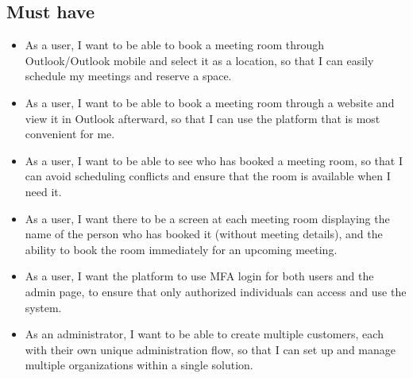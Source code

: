 \subsection{Must have}
\begin{itemize}
\item As a user, I want to be able to book a meeting room through Outlook/Outlook mobile and select it as a location, so that I can easily schedule my meetings and reserve a space.
\item As a user, I want to be able to book a meeting room through a website and view it in Outlook afterward, so that I can use the platform that is most convenient for me.
\item As a user, I want to be able to see who has booked a meeting room, so that I can avoid scheduling conflicts and ensure that the room is available when I need it.
\item As a user, I want there to be a screen at each meeting room displaying the name of the person who has booked it (without meeting details), and the ability to book the room immediately for an upcoming meeting.
\item As a user, I want the platform to use MFA login for both users and the admin page, to ensure that only authorized individuals can access and use the system.
\item As an administrator, I want to be able to create multiple customers, each with their own unique administration flow, so that I can set up and manage multiple organizations within a single solution. %
\end{itemize}



